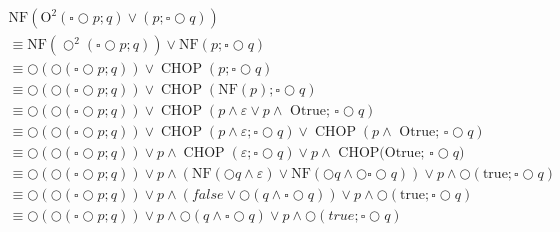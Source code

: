 $\begin{array}{l}{\mathrm{NF}\left(\mathrm{O}^{2}(\square \bigcirc p ; q) \vee(p ; \square \bigcirc q)\right)} \\

\equiv \mathrm{NF}\left(\bigcirc^{2}(\square \bigcirc p ; q)\right) \vee \mathrm{NF}(p ; \square \bigcirc q) \\

\equiv \bigcirc(\bigcirc(\square \bigcirc p ; q)) \vee \operatorname{CHOP}(p ; \square \bigcirc q) \\

\equiv \bigcirc(\bigcirc(\square \bigcirc p ; q)) \vee \operatorname{CHOP}(\mathrm{NF}(p) ; \square \bigcirc q) \\

\equiv \bigcirc(\bigcirc(\square \bigcirc p ; q)) \vee \operatorname{CHOP}(p \wedge \varepsilon \vee p \wedge \text { Otrue; } \square \bigcirc q) \\

\equiv \bigcirc(\bigcirc(\square \bigcirc p ; q)) \vee \operatorname{CHOP}(p \wedge \varepsilon ; \square \bigcirc q) \vee \operatorname{CHOP}(p \wedge \text { Otrue; } \square \bigcirc q) \\

\equiv \bigcirc(\bigcirc(\square \bigcirc p ; q)) \vee p \wedge \operatorname{CHOP}(\varepsilon ; \square \bigcirc q) \vee p \wedge \text { CHOP(Otrue; } \square \bigcirc q ) \\

\equiv \bigcirc(\bigcirc(\square \bigcirc p ; q)) \vee p \wedge(\mathrm{NF}(\bigcirc q \wedge \varepsilon) \vee \mathrm{NF}(\bigcirc q \wedge \bigcirc \square \bigcirc q)) \vee p \wedge \bigcirc(\text {true} ; \square \bigcirc q) \\

{\equiv \bigcirc(\bigcirc(\square \bigcirc p ; q)) \vee p \wedge(f a l s e \vee \bigcirc(q \wedge \square \bigcirc q)) \vee p \wedge \bigcirc(\text {true} ; \square \bigcirc q)} \\ {\equiv \bigcirc(\bigcirc(\square \bigcirc p ; q)) \vee p \wedge \bigcirc(q \wedge \square \bigcirc q) \vee p \wedge \bigcirc(t r u e ; \square \bigcirc q)}
\end{array}$










